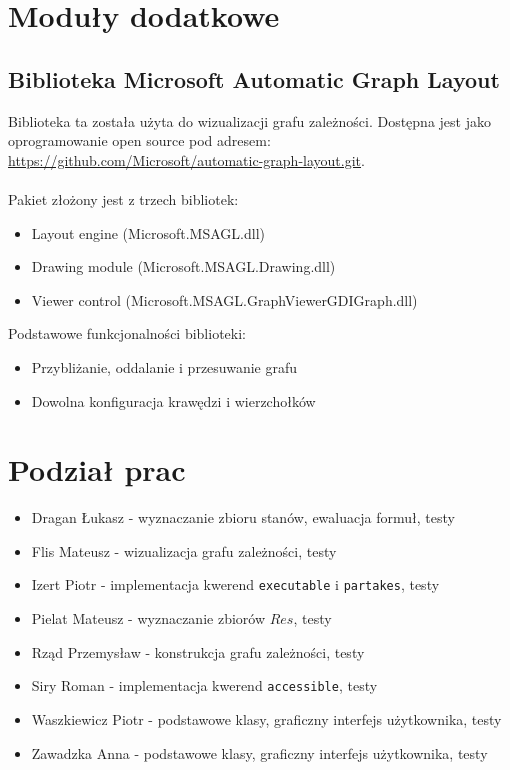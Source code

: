 \documentclass{article}
\begin{document}
\section{Moduły dodatkowe}
\subsection{Biblioteka Microsoft Automatic Graph Layout}
Biblioteka ta została użyta do wizualizacji grafu zależności. Dostępna jest jako oprogramowanie open source pod adresem: \\ \url{https://github.com/Microsoft/automatic-graph-layout.git}. \\\\
Pakiet złożony jest z trzech bibliotek:
\begin{itemize}
    \item Layout engine (Microsoft.MSAGL.dll)
    \item Drawing module (Microsoft.MSAGL.Drawing.dll)
    \item Viewer control (Microsoft.MSAGL.GraphViewerGDIGraph.dll)
\end{itemize}
Podstawowe funkcjonalności biblioteki:
\begin{itemize}
    \item Przybliżanie, oddalanie i przesuwanie grafu
    \item Dowolna konfiguracja krawędzi i wierzchołków
\end{itemize}

\newpage
\section{Podział prac}
\begin{itemize}
    \item Dragan Łukasz - wyznaczanie zbioru stanów, ewaluacja formuł, testy
    \item Flis Mateusz - wizualizacja grafu zależności, testy
    \item Izert Piotr - implementacja kwerend \texttt{executable} i \texttt{partakes}, testy
    \item Pielat Mateusz - wyznaczanie zbiorów $Res$, testy
    \item Rząd Przemysław - konstrukcja grafu zależności, testy
    \item Siry Roman - implementacja kwerend \texttt{accessible}, testy 
	\item Waszkiewicz Piotr - podstawowe klasy, graficzny interfejs użytkownika, testy
    \item Zawadzka Anna - podstawowe klasy, graficzny interfejs użytkownika, testy
\end{itemize}
\end{document}
